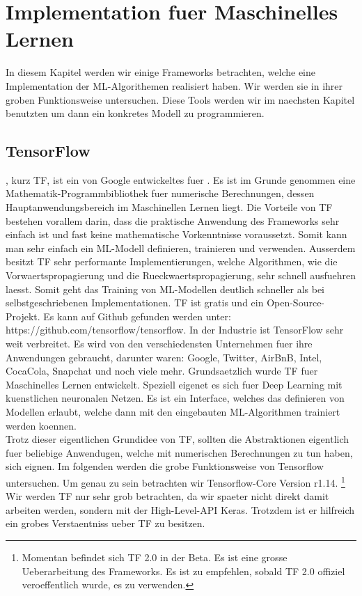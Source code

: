 
\chapter{Implementation fuer Maschinelles Lernen}
In diesem Kapitel werden wir einige Frameworks betrachten, welche eine
Implementation der ML-Algorithemen realisiert haben. Wir werden sie in ihrer
groben Funktionsweise untersuchen. Diese Tools werden wir im
naechsten Kapitel benutzten um dann ein konkretes Modell zu programmieren.

\section{TensorFlow}
, kurz TF, ist ein von Google entwickeltes  fuer
. Es ist im Grunde genommen eine
Mathematik-Programmbibliothek fuer numerische Berechnungen, dessen Hauptanwendungsbereich im Maschinellen Lernen
liegt. Die Vorteile von TF bestehen vorallem darin, dass die praktische
Anwendung des Frameworks sehr
einfach ist und fast keine mathematische Vorkenntnisse voraussetzt. Somit kann
man sehr einfach ein ML-Modell definieren, trainieren und verwenden. Ausserdem
besitzt TF sehr performante Implementierungen, welche Algorithmen, wie die
Vorwaertspropagierung und die Rueckwaertspropagierung, sehr schnell ausfuehren
laesst. Somit geht das Training von ML-Modellen deutlich schneller als bei
selbstgeschriebenen Implementationen.
TF ist gratis und ein Open-Source-Projekt. Es kann auf Github gefunden werden
unter: https://github.com/tensorflow/tensorflow.
\para{}
In der Industrie ist TensorFlow sehr weit verbreitet. Es wird von den
verschiedensten Unternehmen fuer ihre Anwendungen gebraucht, darunter waren:
Google, Twitter, AirBnB, Intel, CocaCola, Snapchat und noch viele mehr.
\para{}
Grundsaetzlich wurde TF fuer Maschinelles Lernen entwickelt. Speziell eigenet es
sich fuer Deep Learning mit kuenstlichen neuronalen Netzen. Es ist ein
Interface, welches das definieren von Modellen erlaubt, welche dann mit den
eingebauten ML-Algorithmen trainiert werden koennen. \\
Trotz dieser eigentlichen Grundidee von TF, sollten die Abstraktionen eigentlich
fuer beliebige Anwendugen, welche mit numerischen Berechnungen zu tun haben,
sich eignen.
\para{}
Im folgenden werden die grobe Funktionsweise von Tensorflow untersuchen. Um
genau zu sein betrachten wir Tensorflow-Core Version r1.14.
\footnote{Momentan befindet sich TF 2.0 in der Beta. Es ist eine grosse
  Ueberarbeitung des Frameworks. Es ist zu empfehlen, sobald TF 2.0 offiziel
  veroeffentlich wurde, es zu verwenden.}
Wir werden TF nur sehr grob betrachten, da wir spaeter nicht direkt damit
arbeiten werden, sondern mit der High-Level-API Keras. Trotzdem ist er hilfreich
ein grobes Verstaentniss ueber TF zu besitzen.


